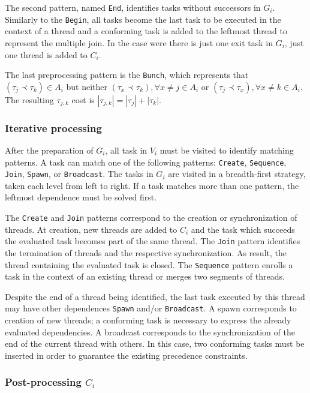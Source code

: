 \documentclass[twocolumn]{svjour3}
\begin{document}
The second pattern, named \verb+End+, identifies tasks without successors in $G_i$. Similarly to the \verb+Begin+, all tasks become the last task to be executed in the context of a thread and a conforming task is added to the leftmost thread to represent the multiple join. In the case were there is just one exit task in $G_i$, just one thread is added to $C_i$. 

The last preprocessing pattern is the \verb+Bunch+, which represents that $(\tau_j \prec \tau_k) \in A_i $ but neither $(\tau_x \prec \tau_k), \forall x \neq j \in A_i $ or  $(\tau_j \prec \tau_x), \forall x \neq k \in A_i $. The resulting $\tau_{j,k}$ cost is $|\tau_{j,k}| = |\tau_j| + |\tau_k|$.

\subsubsection{Iterative processing}

After the preparation of $G_i$, all task in $V_i$ must be visited to identify matching patterns. A task can match one of the following patterns: \verb+Create+, \verb+Sequence+, \verb+Join+, \verb+Spawn+, or \verb+Broadcast+. The tasks in $G_i$ are visited in a breadth-first strategy, taken each level from left to right. If a task matches more than one pattern, the leftmost dependence must be solved first.

The \verb+Create+ and \verb+Join+ patterns correspond to the creation or synchronization of threads. At creation, new threads are added to $C_i$ and the task which succeeds the evaluated task becomes part of the same thread. The \verb+Join+ pattern identifies the termination of threads and the respective synchronization. As result, the thread containing the evaluated task is closed. The \verb+Sequence+ pattern enrolls a task in the context of an existing thread or merges two segments of threads.

Despite the end of a thread being identified, the last task executed by this thread may have other dependences \verb+Spawn+ and/or \verb+Broadcast+. A spawn corresponds to creation of new threads; a conforming task is necessary to express the already evaluated dependencies. A broadcast corresponds to the synchronization of the end of the current thread with others. In this case, two conforming tasks must be inserted in order to guarantee the existing precedence constraints.

\subsubsection{Post-processing $C_i$}
\end{document}
